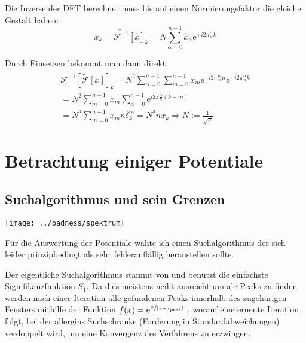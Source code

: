 \documentclass[10pt,a4paper,german]{scrartcl}
\begin{document}
		Die Inverse der DFT berechnet muss bis auf einen Normierungsfaktor die gleiche
		Gestalt haben:
		\begin{equation}
		\label{eq:idft}
			x_k
			= \tilde{\mathcal{F}^{-1}}[\hat{x}]_k
			= N \sum_{\alpha=0}^{n-1} \hat{x}_\alpha \mathrm{e}^{+ i 2\pi \frac{\alpha}{n} k}
		\end{equation}

		Durch Einsetzen bekommt man dann direkt:
		\begin{multline*}
			\tilde{\mathcal{F}^{-1}}[\tilde{\mathcal{F}}[x]]_k
			= N^2 \sum_{\alpha=0}^{n-1}
				\sum_{m=0}^{n-1} x_m \mathrm{e}^{- i 2\pi \frac{m}{n} \alpha}
		 	\mathrm{e}^{+ i 2\pi \frac{\alpha}{n} k} \\
		 	= N^2 \sum_{m=0}^{n-1} x_m
		 	  \sum_{\alpha=0}^{n-1}	\mathrm{e}^{i 2\pi \frac{\alpha}{n}(k-m)}\\
		 	= N^2 \sum_{m=0}^{n-1} x_m
		 	  n \delta^m_k
		 	= N^2 n x_k \Rightarrow N := \frac{1}{\sqrt{n}}
		\end{multline*}

  \section{Betrachtung einiger Potentiale}
  	\subsection{Suchalgorithmus und sein Grenzen}
			\texttt{[image: ../badness/spektrum]}
			\begin{center}\end{center}
			
			Für die Auswertung der Potentiale wähte ich einen Suchalgorithmus der sich
			leider prinzipbedingt als sehr fehleranflällig heraustellen sollte. 
			
			Der eigentliche Suchalgorithmus stammt von \cite{SAPS} und benutzt die
			einfachste Signifikanzfunktion $S_1$. Da dies meistens nciht ausreicht um
			ale Peaks zu finden werden nach einer Iteration alle gefundenen Peaks
			innerhalb des zugehürigen Fensters mithilfe der Funktion
			$f(x)=\mathrm{e}^{\nicefrac{w}{|x-x_\mathrm{peak}|}}$ \grqq, 
			worauf eine erneute Iteration folgt, bei der allergins Suchschranke 
			(Forderung in Standardabweichungen)
			verdoppelt wird, um eine Konvergenz des Verfahrens zu erzwingen.
			
\end{document}
